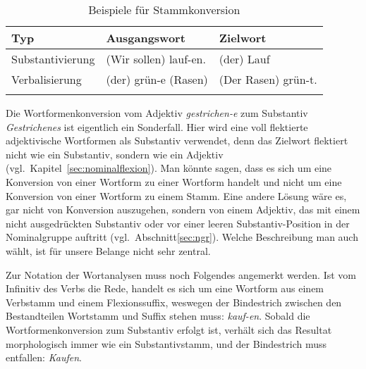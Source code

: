 \begin{table}
  \centering
  \caption{Beispiele für Wortformenkonversion}
  \label{tab:wfkonv}
\end{table}

\begin{table}
  \centering
  \begin{tabular}{lll}
    \lsptoprule
    \textbf{Typ} & \textbf{Ausgangswort} & \textbf{Zielwort} \\
    \midrule
    Substantivierung & (Wir sollen) lauf-en. & (der) Lauf \\
    Verbalisierung & (der) grün-e (Rasen) & (Der Rasen) grün-t.\\
    \lspbottomrule
  \end{tabular}
  \caption{Beispiele für Stammkonversion}
  \label{tab:stammkonv}
\end{table}

Die Wortformenkonversion vom Adjektiv \textit{gestrichen-e} zum Substantiv \textit{Gestrichenes} ist eigentlich ein Sonderfall.
Hier wird eine voll flektierte adjektivische Wortformen als Substantiv verwendet, denn das Zielwort flektiert nicht wie ein Substantiv, sondern wie ein Adjektiv (vgl.\ Kapitel~\ref{sec:nominalflexion}).
Man könnte sagen, dass es sich um eine Konversion von einer Wortform zu einer Wortform handelt und nicht um eine Konversion von einer Wortform zu einem Stamm.
Eine andere Lösung wäre es, gar nicht von Konversion auszugehen, sondern von einem Adjektiv, das mit einem nicht ausgedrückten Substantiv oder vor einer leeren Substantiv-Position in der Nominalgruppe auftritt (vgl.\ Abschnitt\ref{sec:ngr}).
Welche Beschreibung man auch wählt, ist für unsere Belange nicht sehr zentral.

Zur Notation der Wortanalysen muss noch Folgendes angemerkt werden.
Ist vom Infinitiv des Verbs die Rede, handelt es sich um eine Wortform aus einem Verbstamm und einem Flexionssuffix, weswegen der Bindestrich zwischen den Bestandteilen Wortstamm und Suffix stehen muss: \textit{kauf-en}.
Sobald die Wortformenkonversion zum Substantiv erfolgt ist, verhält sich das Resultat morphologisch immer wie ein Substantivstamm, und der Bindestrich muss entfallen: \textit{Kaufen}.

